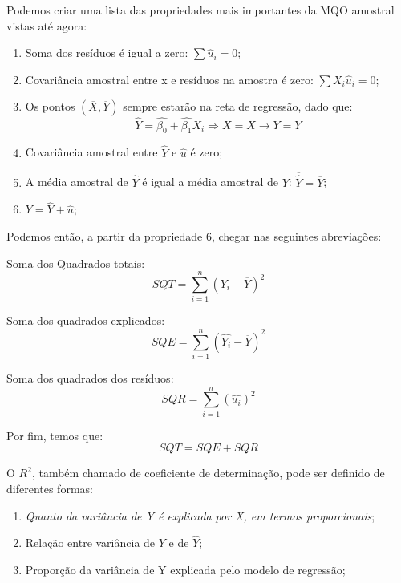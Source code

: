 \documentclass[12pt,a4paper,oneside,brazil]{abntex2}
\begin{document}
Podemos criar uma lista das propriedades mais importantes da MQO amostral vistas até agora:
\begin{enumerate}
\item Soma dos resíduos é igual a zero: $\sum \limits \hat{u}_i = 0$;
\item Covariância amostral entre x e resíduos na amostra é zero: $\sum \limits X_i \hat{u}_i = 0$;
\item Os pontos $( \overline{X}, \overline{Y})$ sempre estarão na reta de regressão, dado que:
\[ \hat{Y} = \hat{\beta_0} + \hat{\beta_1} X_i \Rightarrow X = \overline{X} \rightarrow Y = \overline{Y}\]
\item Covariância amostral entre $\hat{Y}$ e $ \hat{u}$ é zero;
\item A média amostral de $\hat{Y}$ é igual a média amostral de $Y$: $ \overline{\hat{Y}} = \overline{Y}$;
\item $Y = \hat{Y} + \hat{u}$;
\end{enumerate}

Podemos então, a partir da propriedade 6, chegar nas seguintes abreviações: \newline
 
 Soma dos Quadrados totais:
 \begin{equation}\label{SQT}
  SQT = \sum \limits_{i = 1}^{n} ( Y_i - \overline{Y})^2
 \end{equation}
 
 Soma dos quadrados explicados:
  \begin{equation}\label{SQE}
 SQE =  \sum \limits_{i = 1}^{n} ( \hat{Y_i} - \overline{Y})^2
 \end{equation}
 
 Soma dos quadrados dos resíduos:
 \begin{equation} \label{SQR}
 SQR = \sum \limits_{i = 1}^{n} (\hat{u_i})^2
 \end{equation}
 
 Por fim, temos que:
  \begin{equation} \label{SQR}
SQT = SQE + SQR
 \end{equation}
 
 O $R^2$, também chamado de coeficiente de determinação, pode ser definido de diferentes formas:
 \begin{enumerate}
 \item \emph{Quanto da variância de Y é explicada por X, em termos proporcionais};
 \item Relação entre variância de $Y$ e de $\hat{Y}$;
 \item Proporção da variância de Y explicada pelo modelo de regressão;
\end{enumerate} 
 
\end{document}
